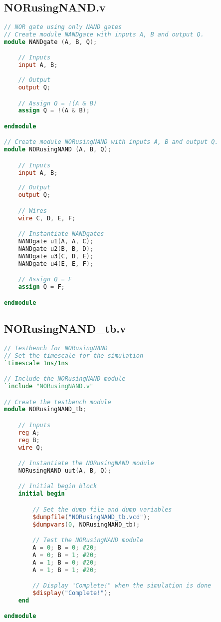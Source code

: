 \documentclass[a4paper,12pt]{article}
\begin{document}
\subsection*{NORusingNAND.v}
\begin{lstlisting}[language=Verilog, caption=NORusingNAND.v]
// NOR gate using only NAND gates
// Create module NANDgate with inputs A, B and output Q.
module NANDgate (A, B, Q);

    // Inputs
    input A, B;
    
    // Output
    output Q;

    // Assign Q = !(A & B)
    assign Q = !(A & B);

endmodule

// Create module NORusingNAND with inputs A, B and output Q.
module NORusingNAND (A, B, Q);

    // Inputs
    input A, B;
    
    // Output
    output Q;

    // Wires
    wire C, D, E, F;

    // Instantiate NANDgates
    NANDgate u1(A, A, C);
    NANDgate u2(B, B, D);
    NANDgate u3(C, D, E);
    NANDgate u4(E, E, F);

    // Assign Q = F
    assign Q = F;

endmodule

\end{lstlisting}

\newpage

\subsection*{NORusingNAND\_tb.v}
\begin{lstlisting}[language=Verilog, caption=NORusingNAND_tb.v]
// Testbench for NORusingNAND
// Set the timescale for the simulation
`timescale 1ns/1ns

// Include the NORusingNAND module
`include "NORusingNAND.v"

// Create the testbench module
module NORusingNAND_tb;

    // Inputs
    reg A;
    reg B;
    wire Q;

    // Instantiate the NORusingNAND module
    NORusingNAND uut(A, B, Q);

    // Initial begin block
    initial begin

        // Set the dump file and dump variables
        $dumpfile("NORusingNAND_tb.vcd");
        $dumpvars(0, NORusingNAND_tb);

        // Test the NORusingNAND module
        A = 0; B = 0; #20;
        A = 0; B = 1; #20;
        A = 1; B = 0; #20;
        A = 1; B = 1; #20;

        // Display "Complete!" when the simulation is done
        $display("Complete!");
    end

endmodule

\end{lstlisting}
\end{document}
